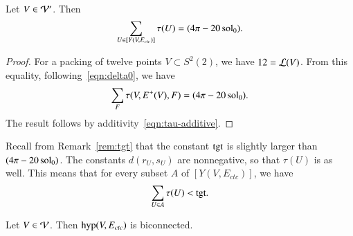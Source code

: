 \documentclass{llncs}
\def\op#1{{\hbox{#1}}}
\begin{document}
\begin{lemma} Let $V\in {\mathcal V}'$.  Then
\[
\sum_{U\in [Y(V,E_{ctc})]} \tau(U) = (4\pi - 20\operatorname{sol}_0).
\]
\end{lemma}

%
\begin{proof} For a packing of twelve points $V\subset S^2(2)$, we have
$12={\mathcal L}(V)$.   From this equality, following~\eqref{eqn:delta0}, we have
\[
  \sum_F \tau (V,E^+(V),F) = (4\pi - 20\operatorname{sol}_0). 
\]
The result follows by additivity~\eqref{eqn:tau-additive}.
\end{proof}

Recall from Remark~\ref{rem:tgt} that the constant $\op{tgt}$ is slightly
larger than $(4\pi-20\operatorname{sol}_0)$.  The constants $d(r_U,s_U)$ are nonnegative, so that
$\tau(U)$ is as well.  This means that for every subset
$A$ of $[Y(V,E_{ctc})]$, we have
\begin{equation}\label{eqn:subtgt}
\sum_{U\in A} \tau(U) < \op{tgt}.
\end{equation}



\begin{lemma}[biconnected]\label{lemma:biconnected}
  Let $V\in {\mathcal V}$.  Then $\op{hyp}(V,E_{ctc})$ is biconnected.
\end{lemma}
\end{document}
